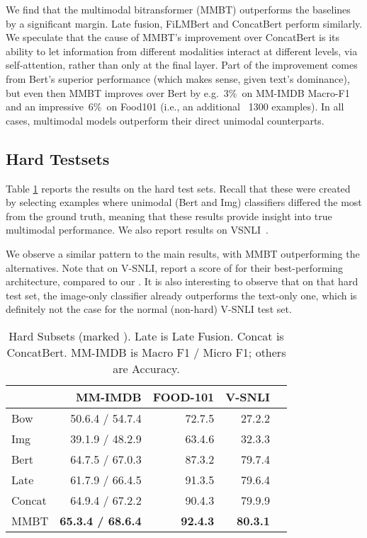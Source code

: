 \documentclass[11pt,a4paper]{article}
\begin{document}
We find that the multimodal bitransformer (MMBT) outperforms the baselines by a significant margin. Late fusion, FiLMBert and ConcatBert perform similarly. We speculate that the cause of MMBT's improvement over ConcatBert is its ability to let information from different modalities interact at different levels, via self-attention, rather than only at the final layer. Part of the improvement comes from Bert's superior performance (which makes sense, given text's dominance), but even then MMBT improves over Bert by e.g.~3\%~on MM-IMDB Macro-F1 and an impressive~6\%~on Food101 (i.e., an additional ~1300 examples).
In all cases, multimodal models outperform their direct unimodal counterparts. 






\subsection{Hard Testsets}

Table \ref{tab:hard} reports the results on the hard test sets. Recall that these were created by selecting examples where unimodal (Bert and Img) classifiers differed the most from the ground truth, meaning that these results provide insight into true multimodal performance. We also report results on VSNLI~\cite{Gururangan:2018arxiv}. 

We observe a similar pattern to the main results, with MMBT outperforming the alternatives. Note that on V-SNLI,  report a score of  for their best-performing architecture, compared to our . It is also interesting to observe that on that hard test set, the image-only classifier already outperforms the text-only one, which is definitely not the case for the normal (non-hard) V-SNLI test set. 



\begin{table}[t]
\centering\small
  \begin{tabular}{lrrrr}
    \toprule
    & MM-IMDB & FOOD-101 & V-SNLI \\\midrule
  	Bow & 50.6.4 / 54.7.4 & 72.7.5 & 27.2.2\\
  	Img & 39.1.9 / 48.2.9 & 63.4.6 & 32.3.3\\
  	Bert & 64.7.5 / 67.0.3 & 87.3.2 & 79.7.4\\\midrule
  	Late & 61.7.9 / 66.4.5 & 91.3.5 & 79.6.4\\
  	Concat & 64.9.4 / 67.2.2 & 90.4.3 & 79.9.9\\
  	MMBT & \textbf{65.3.4 / 68.6.4} & \textbf{92.4.3} & \textbf{80.3.1}\\
  	\bottomrule
  \end{tabular}
    \caption{Hard Subsets (marked ). Late is Late Fusion. Concat is ConcatBert. MM-IMDB is Macro F1 / Micro F1; others are Accuracy.}
     \label{tab:hard}
\end{table}
\end{document}
